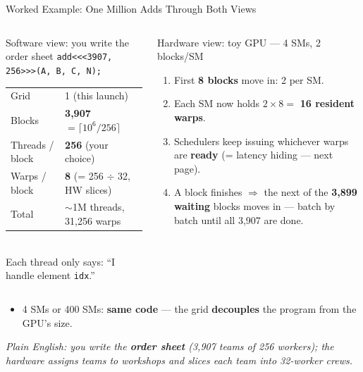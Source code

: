 \documentclass[aspectratio=169]{beamer}
\newcommand{\kw}[1]{\textbf{\textcolor{kwblue}{#1}}}
\newcommand{\pe}[1]{\par{\setlength{\fboxsep}{2.5pt}\noindent\colorbox{navy!9}{\parbox{\dimexpr\textwidth-5pt\relax}{\footnotesize\itshape Plain English: #1}}}}
\begin{document}
\begin{frame}{Worked Example: One Million Adds Through Both Views}
  \begin{columns}[t]
    \begin{block}{Software view: you write the order sheet}
      \footnotesize
      \texttt{add<<<3907, 256>>>(A, B, C, N);}\\[4pt]
      {\scriptsize\setlength{\tabcolsep}{3pt}
      \begin{tabular}{@{}ll@{}}
        \toprule
        Grid & 1 (this launch) \\
        Blocks & \kw{3{,}907} $= \lceil 10^6/256 \rceil$ \\
        Threads / block & \kw{256} (your choice) \\
        Warps / block & \kw{8} (= 256 $\div$ 32, HW slices) \\
        Total & $\sim$1M threads, 31{,}256 warps \\
        \bottomrule
      \end{tabular}}\\[4pt]
      Each thread only says: ``I handle element \texttt{idx}.''
    \end{block}
    \begin{block}{Hardware view: toy GPU --- 4 SMs, 2 blocks/SM}
      \footnotesize
      \begin{enumerate}
        \item First \kw{8 blocks} move in: 2 per SM.
        \item Each SM now holds $2 \times 8 = $ \kw{16 resident warps}.
        \item Schedulers keep issuing whichever warps are \kw{ready} (= latency hiding --- next page).
        \item A block finishes $\Rightarrow$ the next of the \kw{3{,}899 waiting} blocks
              moves in --- batch by batch until all 3{,}907 are done.
      \end{enumerate}
    \end{block}
  \end{columns}
  \smallskip
  \begin{itemize}\footnotesize
    \item 4 SMs or 400 SMs: \kw{same code} --- the grid \kw{decouples} the program from the GPU's size.
  \end{itemize}
  \pe{you write the \kw{order sheet} (3,907 teams of 256 workers); the hardware assigns teams to workshops and slices each team into 32-worker crews.}
\end{frame}
\end{document}

